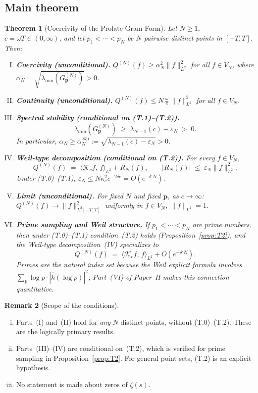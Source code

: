 \documentclass[12pt,a4paper]{amsart}
\newtheorem{theorem}{Theorem}[section]
\theoremstyle{definition}
\newtheorem{remark}[theorem]{Remark}
\newcommand{\Kop}{\mathcal{K}_c}
\newcommand{\Kul}{\kappa_c}
\newcommand{\GVM}{G^{(N)}_{\mathbf{p}}}
\newcommand{\AM}{\alpha_N}
\newcommand{\QM}{Q^{(N)}}
\newcommand{\norm}[1]{\|#1\|}
\newcommand{\ip}[2]{\langle #1,\, #2\rangle}
\begin{document}
\subsection{Main theorem}

\begin{theorem}[Coercivity of the Prolate Gram Form]\label{thm:main}
Let $N\geq1$, $c=\omega T\in(0,\infty)$, and let
$p_1<\cdots<p_N$ be $N$ pairwise distinct points in $[-T,T]$.
Then:

\begin{enumerate}[(I)]
\item \textbf{Coercivity (unconditional).}
$\QM(f)\geq\AM^2\norm{f}_{L^2}^2$ for all $f\in V_N$,
where $\AM=\sqrt{\lambda_{\min}(\GVM)}>0$.

\item \textbf{Continuity (unconditional).}
$\QM(f)\leq N\,\frac{\omega}{\pi}\,\norm{f}_{L^2}^2$
for all $f\in V_N$.

\item \textbf{Spectral stability (conditional on (T.1)--(T.2)).}
\[
  \lambda_{\min}(\GVM)\;\geq\;\lambda_{N-1}(c)-\varepsilon_N\;>\;0.
\]
In particular, $\AM\geq\AM^{\mathrm{exp}}:=
\sqrt{\lambda_{N-1}(c)-\varepsilon_N}>0$.

\item \textbf{Weil-type decomposition (conditional on (T.2)).}
For every $f\in V_N$,
\[
  \QM(f)\;=\;\ip{\Kop f}{f}_{L^2}+R_N(f),
  \qquad
  |R_N(f)|\;\leq\;\varepsilon_N\norm{f}_{L^2}^2.
\]
Under (T.0)--(T.1), $\varepsilon_N\leq N\Kul^2 e^{-2\delta c}=O(e^{-\delta'N})$.

\item \textbf{Limit (unconditional).}
For fixed $N$ and fixed $\mathbf{p}$, as $c\to\infty$:
$\QM(f)\to\norm{f}_{L^2[-T,T]}^2$ uniformly in
$f\in V_N$, $\norm{f}_{L^2}=1$.

\item \textbf{Prime sampling and Weil structure.}
If $p_1<\cdots<p_N$ are prime numbers, then under (T.0)--(T.1)
condition~(T.2) holds (Proposition~\ref{prop:T2}), and
the Weil-type decomposition~(IV) specializes to
\[
  \QM(f)\;=\;\ip{\Kop f}{f}_{L^2}+O(e^{-\delta'N}).
\]
Primes are the natural index set because the Weil explicit
formula involves $\sum_p\log p\cdot|\widehat{h}(\log p)|^2$;
Part~(VI) of Paper~II makes this connection quantitative.
\end{enumerate}
\end{theorem}

\begin{remark}[Scope of the conditions]\label{rem:scope}
\begin{enumerate}[(i)]
\item Parts~(I) and~(II) hold for \emph{any} $N$ distinct points,
without (T.0)--(T.2). These are the logically primary results.
\item Parts~(III)--(IV) are conditional on~(T.2), which is verified
for prime sampling in Proposition~\ref{prop:T2}. For general point
sets, (T.2) is an explicit hypothesis.
\item No statement is made about zeros of $\zeta(s)$.
\end{enumerate}
\end{remark}
\end{document}
